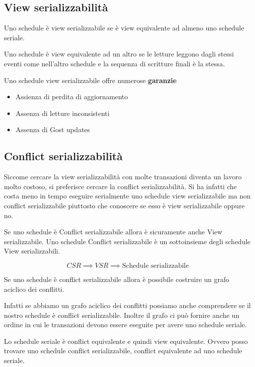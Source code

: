 \subsection{View serializzabilità}

Uno schedule è view serializzabile se è view equivalente ad almeno uno schedule seriale.

Uno schedule è view equivalente ad un altro se le letture leggono dagli stessi eventi come nell'altro schedule e la sequenza di scritture finali è la stessa.

Uno schedule view serializzabile offre numerose \textbf{garanzie}
\begin{itemize}
    \item Assienza di perdita di aggiornamento
    \item Assenza di letture inconsistenti
    \item Assenza di Gost updates
\end{itemize}

\subsection{Conflict serializzabilità}

Siccome cercare la view serializzabilità con molte transazioni diventa un lavoro molto costoso, si preferisce cercare la conflict serializzabilità. Si ha infatti che costa meno in tempo eseguire serialmente uno schedule view serializzabile ma non conflict serializzabile piuttosto che conoscere se esso è view serializzabile oppure no.

Se uno schedule è Conflict serializzabile allora è sicuramente anche View serializzabile. Uno schedule Conflict serializzabile è un sottoinsieme degli schedule View serializzabili.

\[CSR \implies VSR \implies \text{Schedule serializzabile}\]

Se uno schedule è conflict serializzabile allora è possibile costruire un grafo aciclico dei conflitti.

Infatti se abbiamo un grafo aciclico dei conflitti possiamo anche comprendere se il nostro schedule è conflict serializzabile. Inoltre il grafo ci può fornire anche un ordine in cui le transazioni devono essere eseguite per avere uno schedule seriale.

Lo schedule seriale è conflict equivalente e quindi view equivalente. Ovvero posso trovare uno schedule conflict serializzabile, conflict equivalente ad uno schedule seriale.

